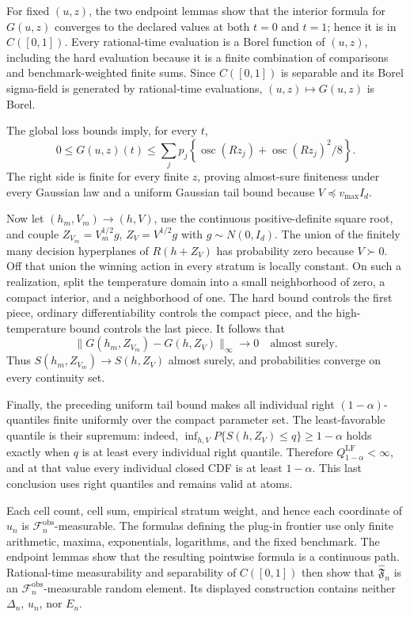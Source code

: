 For fixed \((u,z)\), the two endpoint lemmas show that the interior formula for \(G(u,z)\) converges to the declared values at both \(t=0\) and \(t=1\); hence it is in \(C([0,1])\).  Every rational-time evaluation is a Borel function of \((u,z)\), including the hard evaluation because it is a finite combination of comparisons and benchmark-weighted finite sums.  Since \(C([0,1])\) is separable and its Borel sigma-field is generated by rational-time evaluations, \((u,z)\mapsto G(u,z)\) is Borel.

The global loss bounds imply, for every \(t\),
\[
 0\le G(u,z)(t)\le\sum_jp_j\left\{\operatorname{osc}(Rz_j)
       +\operatorname{osc}(Rz_j)^2/8\right\}.
\]
The right side is finite for every finite \(z\), proving almost-sure finiteness under every Gaussian law and a uniform Gaussian tail bound because \(V\preceq v_{\max}I_d\).

Now let \((h_m,V_m)\to(h,V)\), use the continuous positive-definite square root, and couple \(Z_{V_m}=V_m^{1/2}g\), \(Z_V=V^{1/2}g\) with \(g\sim N(0,I_d)\).  The union of the finitely many decision hyperplanes of \(R(h+Z_V)\) has probability zero because \(V\succ0\).  Off that union the winning action in every stratum is locally constant.  On such a realization, split the temperature domain into a small neighborhood of zero, a compact interior, and a neighborhood of one.  The hard bound controls the first piece, ordinary differentiability controls the compact piece, and the high-temperature bound controls the last piece.  It follows that
\[
 \|G(h_m,Z_{V_m})-G(h,Z_V)\|_\infty\longrightarrow0
 \quad\text{almost surely}.
\]
Thus \(S(h_m,Z_{V_m})\to S(h,Z_V)\) almost surely, and probabilities converge on every continuity set.

Finally, the preceding uniform tail bound makes all individual right \((1-\alpha)\)-quantiles finite uniformly over the compact parameter set.  The least-favorable quantile is their supremum: indeed, \(\inf_{h,V}P\{S(h,Z_V)\le q\}\ge1-\alpha\) holds exactly when \(q\) is at least every individual right quantile.  Therefore \(Q_{1-\alpha}^{\mathrm{LF}}<\infty\), and at that value every individual closed CDF is at least \(1-\alpha\).  This last conclusion uses right quantiles and remains valid at atoms.

Each cell count, cell sum, empirical stratum weight, and hence each coordinate of \(\widehat u_n\) is \(\mathcal F_n^{\mathrm{obs}}\)-measurable.  The formulas defining the plug-in frontier use only finite arithmetic, maxima, exponentials, logarithms, and the fixed benchmark.  The endpoint lemmas show that the resulting pointwise formula is a continuous path.  Rational-time measurability and separability of \(C([0,1])\) then show that \(\widehat{\mathfrak F}_n\) is an \(\mathcal F_n^{\mathrm{obs}}\)-measurable random element.  Its displayed construction contains neither \(\Delta_n\), \(u_n\), nor \(E_n\).

